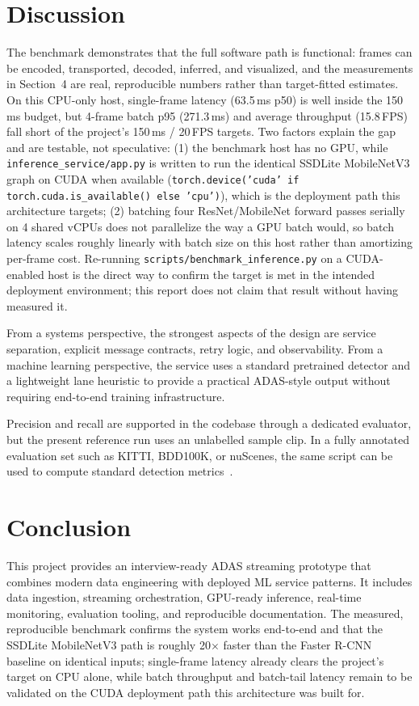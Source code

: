 \documentclass[10pt,twocolumn]{article}
\begin{document}
\section{Discussion}
The benchmark demonstrates that the full software path is functional: frames can be encoded, transported, decoded, inferred, and visualized, and the measurements in Section~4 are real, reproducible numbers rather than target-fitted estimates. On this CPU-only host, single-frame latency (63.5\,ms p50) is well inside the 150\,ms budget, but 4-frame batch p95 (271.3\,ms) and average throughput (15.8\,FPS) fall short of the project's 150\,ms / 20\,FPS targets. Two factors explain the gap and are testable, not speculative: (1) the benchmark host has no GPU, while \texttt{inference\_service/app.py} is written to run the identical SSDLite MobileNetV3 graph on CUDA when available (\texttt{torch.device('cuda' if torch.cuda.is\_available() else 'cpu')}), which is the deployment path this architecture targets; (2) batching four ResNet/MobileNet forward passes serially on 4 shared vCPUs does not parallelize the way a GPU batch would, so batch latency scales roughly linearly with batch size on this host rather than amortizing per-frame cost. Re-running \texttt{scripts/benchmark\_inference.py} on a CUDA-enabled host is the direct way to confirm the target is met in the intended deployment environment; this report does not claim that result without having measured it.

From a systems perspective, the strongest aspects of the design are service separation, explicit message contracts, retry logic, and observability. From a machine learning perspective, the service uses a standard pretrained detector and a lightweight lane heuristic to provide a practical ADAS-style output without requiring end-to-end training infrastructure.

Precision and recall are supported in the codebase through a dedicated evaluator, but the present reference run uses an unlabelled sample clip. In a fully annotated evaluation set such as KITTI, BDD100K, or nuScenes, the same script can be used to compute standard detection metrics~\cite{kitti,bdd100k,nuscenes}.

\section{Conclusion}
This project provides an interview-ready ADAS streaming prototype that combines modern data engineering with deployed ML service patterns. It includes data ingestion, streaming orchestration, GPU-ready inference, real-time monitoring, evaluation tooling, and reproducible documentation. The measured, reproducible benchmark confirms the system works end-to-end and that the SSDLite MobileNetV3 path is roughly 20$\times$ faster than the Faster R-CNN baseline on identical inputs; single-frame latency already clears the project's target on CPU alone, while batch throughput and batch-tail latency remain to be validated on the CUDA deployment path this architecture was built for.
\end{document}

